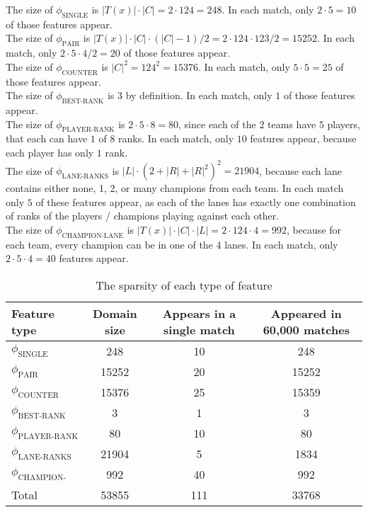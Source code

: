 The size of $\phi_{\text{SINGLE}}$ is $|T(x)| \cdot |C| = 2 \cdot 124 = 248$. In each match, only $2 \cdot 5 = 10$ of those features appear.\\
The size of $\phi_{\text{PAIR}}$ is $|T(x)| \cdot |C| \cdot (|C|-1) / 2 = 2 \cdot 124 \cdot 123 / 2 = 15252$. In each match, only $2 \cdot 5 \cdot 4 / 2 = 20$ of those features appear.\\
The size of $\phi_{\text{COUNTER}}$ is $|C|^2 = 124^2 = 15376$. In each match, only $5 \cdot 5 = 25$ of those features appear.\\
The size of $\phi_{\text{BEST-RANK}}$ is 3 by definition. In each match, only $1$ of those features appear.\\
The size of $\phi_{\text{PLAYER-RANK}}$ is $2 \cdot 5 \cdot 8 = 80$, since each of the $2$ teams have $5$ players, that each can have $1$ of $8$ ranks. In each match, only $10$ features appear, because each player has only $1$ rank.\\
The size of $\phi_{\text{LANE-RANKS}}$ is $|L| \cdot (2 + |R| + |R|^2)^2 = 21904$, because each lane contains either none, 1, 2, or many champions from each team.
In each match only $5$ of these features appear, as each of the lanes has exactly one combination of ranks of the players / champions playing against each other.\\
The size of $\phi_{\text{CHAMPION-LANE}}$ is $|T(x)| \cdot |C| \cdot |L| = 2 \cdot 124 \cdot 4 = 992$, because for each team, every champion can be in one of the 4 lanes. In each match, only $2 \cdot 5 \cdot 4 = 40$ features appear.

\begin{center}
  \begin{table}[!htb]
    \begin{tabular}{|l|ccc|}
      \hline
      Feature type                  & Domain size & Appears in a single match & Appeared in 60,000 matches \\ \hline
      $\phi_{\text{SINGLE}}$        & 248         & 10  & 248               \\ 
      $\phi_{\text{PAIR}}$          & 15252       & 20  & 15252             \\ 
      $\phi_{\text{COUNTER}}$       & 15376       & 25  & 15359             \\ 
      $\phi_{\text{BEST-RANK}}$     & 3           & 1   & 3                 \\ 
      $\phi_{\text{PLAYER-RANK}}$   & 80          & 10  & 80                \\ 
      $\phi_{\text{LANE-RANKS}}$    & 21904       & 5   & 1834              \\ 
      $\phi_{\text{CHAMPION-LANE}}$ & 992         & 40  & 992               \\
      Total                    & 53855       & 111 & 33768             \\ \hline
    \end{tabular}
    \caption{The sparsity of each type of feature}\label{tab:featuresparsity}
  \end{table}
\end{center}

